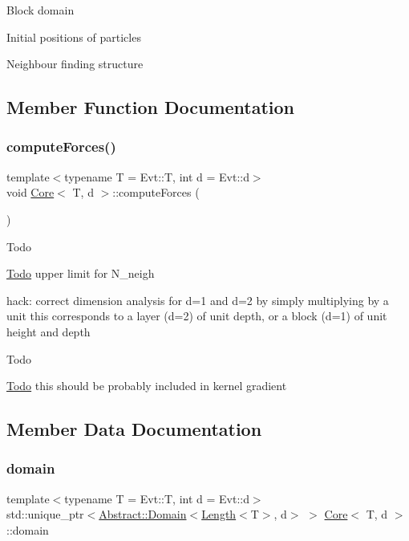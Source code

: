 Block domain

Initial positions of particles

Neighbour finding structure 

\subsection{Member Function Documentation}
\hypertarget{classCore_a1c4bb6ec0e601092692fee50317fa0ca}{}\label{classCore_a1c4bb6ec0e601092692fee50317fa0ca} 
\subsubsection{\texorpdfstring{compute\+Forces()}{computeForces()}}
{\footnotesize\ttfamily template$<$typename T  = Evt\+::T, int d = Evt\+::d$>$ \\
void \hyperlink{classCore}{Core}$<$ T, d $>$\+::compute\+Forces (\begin{DoxyParamCaption}{ }\end{DoxyParamCaption})\hspace{0.3cm}{\ttfamily [inline]}}

\begin{DoxyRefDesc}{Todo}
\item[\hyperlink{todo__todo000002}{Todo}]upper limit for N\+\_\+neigh \end{DoxyRefDesc}


hack\+: correct dimension analysis for d=1 and d=2 by simply multiplying by a unit this corresponds to a layer (d=2) of unit depth, or a block (d=1) of unit height and depth \begin{DoxyRefDesc}{Todo}
\item[\hyperlink{todo__todo000003}{Todo}]this should be probably included in kernel gradient \end{DoxyRefDesc}


\subsection{Member Data Documentation}
\hypertarget{classCore_ac87630cef479b2beaa9ac6cc207e9ee2}{}\label{classCore_ac87630cef479b2beaa9ac6cc207e9ee2} 
\subsubsection{\texorpdfstring{domain}{domain}}
{\footnotesize\ttfamily template$<$typename T  = Evt\+::T, int d = Evt\+::d$>$ \\
std\+::unique\+\_\+ptr$<$\hyperlink{classAbstract_1_1Domain}{Abstract\+::\+Domain}$<$\hyperlink{classBaseUnit}{Length}$<$T$>$, d$>$ $>$ \hyperlink{classCore}{Core}$<$ T, d $>$\+::domain}

